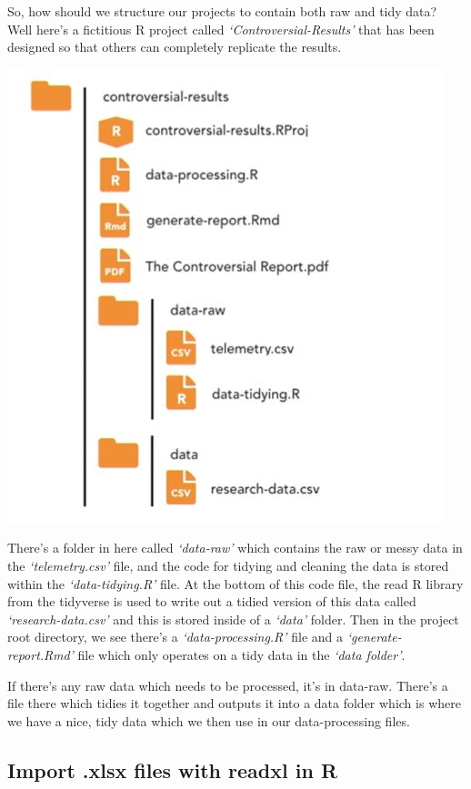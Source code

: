 \documentclass[
]{article}
\begin{document}
So, how should we structure our projects to contain both raw and tidy data? Well here's a fictitious R project called \emph{`Controversial-Results'} that has been designed so that others can completely replicate the results.

\includegraphics{Capture01.JPG}

There's a folder in here called \emph{`data-raw'} which contains the raw or messy data in the \emph{`telemetry.csv'} file, and the code for tidying and cleaning the data is stored within the \emph{`data-tidying.R'} file. At the bottom of this code file, the read R library from the tidyverse is used to write out a tidied version of this data called \emph{`research-data.csv'} and this is stored inside of a \emph{`data'} folder. Then in the project root directory, we see there's a \emph{`data-processing.R'} file and a \emph{`generate-report.Rmd'} file which only operates on a tidy data in the \emph{`data folder'}.

If there's any raw data which needs to be processed, it's in data-raw. There's a file there which tidies it together and outputs it into a data folder which is where we have a nice, tidy data which we then use in our data-processing files.

\hypertarget{import-.xlsx-files-with-readxl-in-r}{%
\subsection{Import .xlsx files with readxl in R}\label{import-.xlsx-files-with-readxl-in-r}}
\end{document}
